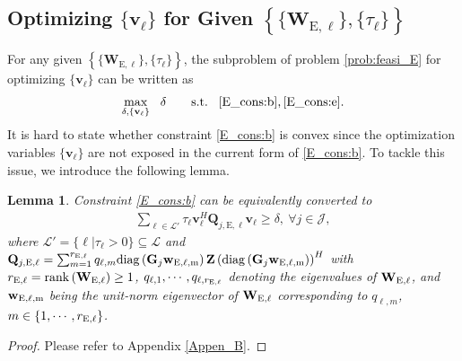 \documentclass[12pt,draftclsnofoot, onecolumn]{IEEEtran}
\theoremstyle{plain}
\newtheorem{lem}{Lemma}
\begin{document}
\begin{sloppypar}
\subsection{Optimizing $\{\mathbf v_\ell\}$ for Given $\left\lbrace \{\mathbf W_{\mathrm E,\ell}\},\{\tau_\ell\} \right\rbrace$}
For any given $\left\lbrace \{\mathbf W_{\mathrm E,\ell}\},\{\tau_\ell\} \right\rbrace$, the subproblem of problem \eqref{prob:feasi_E} for optimizing $\{\mathbf v_\ell\}$ can be written as 
{\setlength\abovedisplayskip{5pt}
\begin{align}\label{E_sub2}
\underset{\delta,\{\mathbf v_\ell\}}{\max} \hspace{3mm} \delta \hspace{7mm}
\text{s.t.} \hspace{3mm}\eqref{E_cons:b}, \eqref{E_cons:e}.
\end{align}}%
It is hard to state whether constraint \eqref{E_cons:b} is convex since the optimization variables $\{\mathbf v_\ell\}$ are not exposed in the current form of \eqref{E_cons:b}. To tackle this issue, we introduce the following lemma.   
\begin{lem}\label{lem}
	\vspace{-3mm}
	Constraint \eqref{E_cons:b} can be equivalently converted to
	{\setlength\abovedisplayskip{5pt}
	\setlength\belowdisplayskip{5pt}
	\begin{align}\label{E_cons:b_eqv}
	\sum_{\ell\in\mathcal L'}\tau_\ell\mathbf v_{\ell}^H\mathbf Q_{j,\mathrm E, \ell}\mathbf v_{\ell} \geq \delta, \ \forall j\in\mathcal J, 
	\end{align}}%
	where $\mathcal L' = \{\ell|\tau_\ell > 0\} \subseteq \mathcal L$ and $\mathbf Q_{j,\mathrm E,\ell} = \sum_{m=1}^{r_{\rm E,\ell}}q_{\ell,m}{\rm diag}\left(\mathbf G_j\mathbf w_{\rm E,\ell,m}\right)\mathbf Z\left( {\rm diag}\left(\mathbf G_j\mathbf w_{\rm E,\ell,m}\right)\right)^H$ with $r_{\rm E,\ell} = {\rm rank}\left(\mathbf W_{\mathrm E,\ell}\right) \geq 1$, $q_{\ell,1}, \cdots, q_{\ell,r_{\rm E,\ell}}$ denoting the eigenvalues of $\mathbf W_{\rm E, \ell}$, and $\mathbf w_{\rm E,\ell,m}$ being the  unit-norm eigenvector of $\mathbf W_{\rm E, \ell}$ corresponding to $q_{\ell,m}$, $m\in\{1,\cdots,r_{\rm E,\ell}\}$.   
\end{lem}
\begin{proof}
\vspace{-3mm}
Please refer to Appendix \ref{Appen_B}.
\vspace{-2mm}
\end{proof}

\end{sloppypar}
\end{document}
